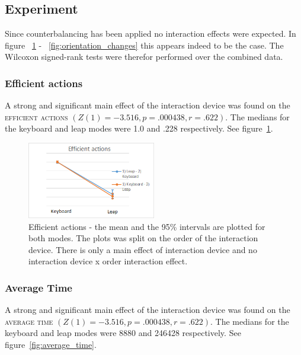 \subsection{Experiment}
Since counterbalancing has been applied no interaction effects were expected. In figure ~\ref{fig:efficient_actions} - ~\ref{fig:orientation_changes} this appears indeed to be the case. The Wilcoxon signed-rank tests were therefor performed over the combined data.

\subsubsection{Efficient actions}

A strong and significant main effect of the interaction device was found on the \textsc{efficient actions} $(Z(1) = -3.516, p = .000438, r = .622)$. The medians for the keyboard and leap modes were 1.0 and .228 respectively. See figure~\ref{fig:efficient_actions}.

\begin{figure}[H]
\centering
\includegraphics[width=0.5\textwidth]{imgs/results/efficient_actions}
\caption{Efficient actions - the mean and the 95\% intervals are plotted for both modes. The plots was split on the order of the interaction device. There is only a main effect of interaction device and no interaction device x order interaction effect.}
\label{fig:efficient_actions}
\end{figure}

\subsubsection{Average Time}

A strong and significant main effect of the interaction device was found on the \textsc{average time} $(Z(1) = -3.516, p = .000438, r = .622)$. The medians for the keyboard and leap modes were 8880 and 246428 respectively. See figure~\ref{fig:average_time}.

